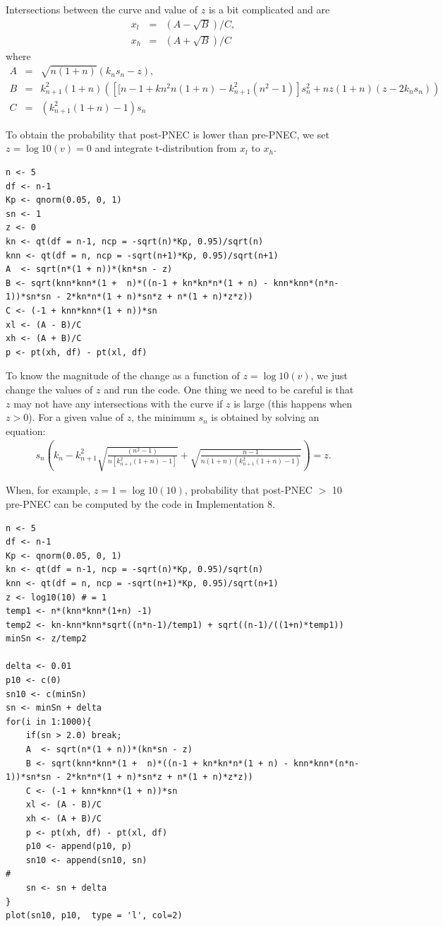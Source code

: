 \documentclass[10pt]{article}
\begin{document}
Intersections between the curve and value of $z$ is a bit complicated and are
\begin{eqnarray*}
x_l &=& (A -\sqrt{B})/C, \\
x_h &=& (A +\sqrt{B})/C
\end{eqnarray*}
where
\begin{eqnarray*}
A &=&  \sqrt{n(1+n)}(k_n s_n - z), \\
B &=& k_{n+1}^2  (1 +   n) \left(\left[[n-1 + kn^2 n (1 + n) - k_{n+1}^2 (n^2-1 )\right] s_n^2 +n z (1+n)(z-2k_n s_n)\right) \\
C &=& \left(k_{n+1}^2(1+n)-1\right)s_n
\end{eqnarray*}

To obtain the probability that post-PNEC is lower than pre-PNEC, we set $z = \log10(v) = 0$ and integrate t-distribution from $x_l$ to $x_h$. 

\begin{lstlisting}[caption=Probability that $\Delta\log\mathrm{PNEC}/s_n$ is positive, label=fuga2]
n <- 5
df <- n-1
Kp <- qnorm(0.05, 0, 1) 
sn <- 1
z <- 0
kn <- qt(df = n-1, ncp = -sqrt(n)*Kp, 0.95)/sqrt(n)
knn <- qt(df = n, ncp = -sqrt(n+1)*Kp, 0.95)/sqrt(n+1)
A  <- sqrt(n*(1 + n))*(kn*sn - z)
B <- sqrt(knn*knn*(1 +  n)*((n-1 + kn*kn*n*(1 + n) - knn*knn*(n*n-1))*sn*sn - 2*kn*n*(1 + n)*sn*z + n*(1 + n)*z*z))
C <- (-1 + knn*knn*(1 + n))*sn
xl <- (A - B)/C
xh <- (A + B)/C
p <- pt(xh, df) - pt(xl, df)
\end{lstlisting}

To know the magnitude of the change as a function of $z = \log10(v)$, we just change the values of $z$ and run the code. One thing we need to be careful is that $z$ may not have any intersections with the curve if $z$ is large (this happens when $z>0$). For a given value of $z$, the minimum $s_n$ is obtained by solving an equation:
\begin{eqnarray*}
s_n\left( k_n-k_{n+1}^2\sqrt{\frac{(n^2-1)}{n[k_{n+1}^2(1+n)-1]}} + \sqrt{\frac{n-1}{n(1+n)(k_{n+1}^2(1+n)-1)}}\right) = z.
\end{eqnarray*}

When, for example, $z = 1 = \log10(10)$, probability that post-PNEC $>$ 10 pre-PNEC can be computed by the code in Implementation 8. 

\begin{lstlisting}[caption=Finding probabilities as a function of $s_n$, label=fuga2]
n <- 5
df <- n-1
Kp <- qnorm(0.05, 0, 1)
kn <- qt(df = n-1, ncp = -sqrt(n)*Kp, 0.95)/sqrt(n)
knn <- qt(df = n, ncp = -sqrt(n+1)*Kp, 0.95)/sqrt(n+1)
z <- log10(10) # = 1
temp1 <- n*(knn*knn*(1+n) -1)
temp2 <- kn-knn*knn*sqrt((n*n-1)/temp1) + sqrt((n-1)/((1+n)*temp1))
minSn <- z/temp2

delta <- 0.01
p10 <- c(0)
sn10 <- c(minSn)
sn <- minSn + delta
for(i in 1:1000){
	if(sn > 2.0) break;
	A  <- sqrt(n*(1 + n))*(kn*sn - z)
	B <- sqrt(knn*knn*(1 +  n)*((n-1 + kn*kn*n*(1 + n) - knn*knn*(n*n-1))*sn*sn - 2*kn*n*(1 + n)*sn*z + n*(1 + n)*z*z))
	C <- (-1 + knn*knn*(1 + n))*sn
	xl <- (A - B)/C
	xh <- (A + B)/C
	p <- pt(xh, df) - pt(xl, df)
	p10 <- append(p10, p)
	sn10 <- append(sn10, sn)
#
	sn <- sn + delta
}
plot(sn10, p10,  type = 'l', col=2)
\end{lstlisting}
\end{document}

